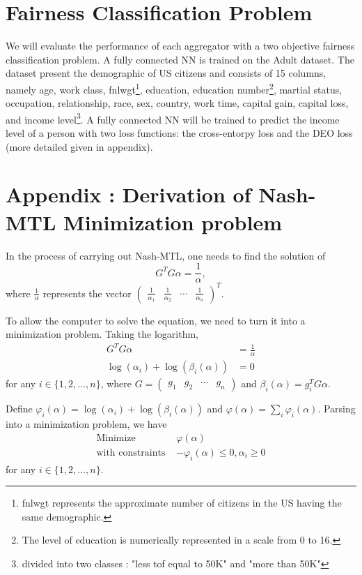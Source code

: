 \documentclass{article}
\renewcommand{\|}{\biggr|}
\begin{document}
\section{Fairness Classification Problem}

We will evaluate the performance of each aggregator with a two objective fairness classification problem. A fully connected NN is trained on the Adult dataset. The dataset present the demographic of US citizens and consists of 15 columns, namely age, work class, fnlwgt\footnote{fnlwgt represents the approximate number of citizens in the US having the same demographic.}, education, education number\footnote{The level of education is numerically represented in a scale from 0 to 16.}, martial status, occupation, relationship, race, sex, country, work time, capital gain, capital loss, and income level\footnote{divided into two classes : "less tof equal to 50K" and "more than 50K"}. A fully connected NN will be trained to predict the income level of a person with two loss functions: the cross-entorpy loss and the DEO loss (more detailed given in appendix). 


    \section{Appendix : Derivation of Nash-MTL Minimization problem}
    In the process of carrying out Nash-MTL, one needs to find the solution of
    \begin{equation*}
    G^T G \alpha = \frac{1}{\alpha},
    \end{equation*}
    where $\frac{1}{\alpha}$ represents the vector $\begin{pmatrix} \frac{1}{\alpha_1} & \frac{1}{\alpha_2} & \cdots & \frac{1}{\alpha_n} \end{pmatrix}^T$.

    To allow the computer to solve the equation, we need to turn it into a minimization problem. Taking the logarithm,
    \begin{align*}
    G^T G \alpha &= \frac{1}{\alpha} \\
    \log(\alpha_i) + \log(\beta_i(\alpha)) &= 0
    \end{align*}
    for any $i \in \{1, 2, \dots, n\}$, where $G = \begin{pmatrix} g_1 & g_2 & \cdots & g_n \end{pmatrix}$ and $\beta_i(\alpha) = g_i^T G \alpha$.

    Define $\varphi_i(\alpha) = \log(\alpha_i) + \log(\beta_i(\alpha))$ and $\varphi(\alpha) = \sum_i \varphi_i(\alpha)$. Parsing into a minimization problem, we have
    \begin{align*}
    \text{Minimize } & \varphi(\alpha) \\
    \text{with constraints } & -\varphi_i(\alpha) \leq 0, \alpha_i \geq 0
    \end{align*}
    for any $i \in \{1, 2, \dots, n\}$.
\end{document}

